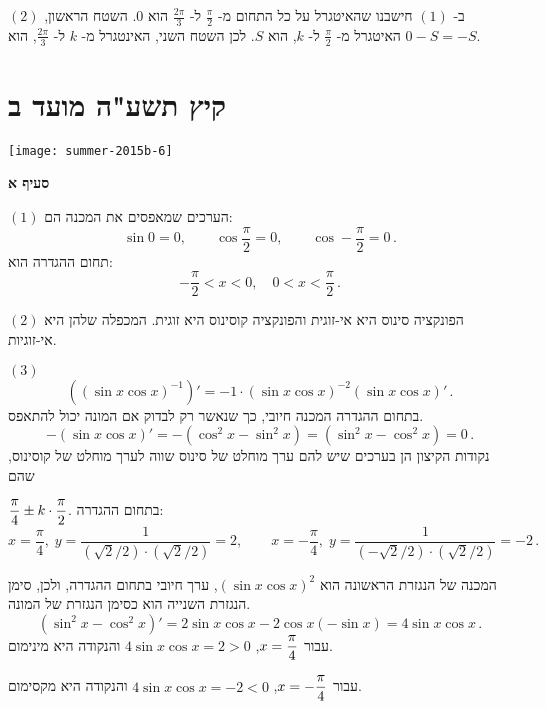 \vspace{-4ex}

$(2)$
ב-%
$(1)$
חישבנו שהאיטגרל על כל התחום מ-%
$\frac{\pi}{2}$
ל-%
$\frac{2\pi}{3}$
הוא 
$0$.
השטח הראשון, האיטגרל מ-%
$\frac{\pi}{2}$
ל-%
$k$,
הוא
$S$.
לכן השטח השני, האינטגרל מ-%
$k$
ל-%
$\frac{2\pi}{3}$,
הוא
$0-S=-S$.

\np


\section{קיץ תשע"ה מועד ב}

\begin{center}
\texttt{[image: summer-2015b-6]}
\end{center}

\textbf{סעיף א}

$(1)$
הערכים שמאפסים את המכנה הם:
\[
\sin 0=0,\quad\quad \cos \frac{\pi}{2}= 0,\quad\quad \cos -\frac{\pi}{2}=0\,.
\]
תחום ההגדרה הוא:
\[
-\frac{\pi}{2} < x < 0,\quad 0 < x < \frac{\pi}{2}\,.
\]

$(2)$
הפונקציה סינוס היא אי-זוגית והפונקציה קוסינוס היא זוגית. המכפלה שלהן היא אי-זוגיות.

$(3)$
\[
((\sin x \cos x)^{-1})'= -1\cdot (\sin x \cos x)^{-2}(\sin x\cos x)'\,.
\]
בתחום ההגדרה המכנה חיובי, כך שנאשר רק לבדוק אם המונה יכול להתאפס.
\[
-(\sin x\cos x)'=-(\cos^2 x-\sin^2 x)=(\sin^2 x-\cos^2 x)=0\,.
\]
נקודות הקיצון הן בערכים שיש להם ערך מוחלט של סינוס שווה לערך מוחלט של קוסינוס, שהם

$\displaystyle\frac{\pi}{4}\pm k\cdot\displaystyle\frac{\pi}{2}$.
בתחום ההגדרה:
\[
x=\frac{\pi}{4},\; y=\frac{1}{(\sqrt{2}/2)\cdot(\sqrt{2}/2)}= 2,\quad\quad x=-\frac{\pi}{4},\; y=\frac{1}{(-\sqrt{2}/2)\cdot(\sqrt{2}/2)}= -2\,.
\]

\np

המכנה של הנגזרת הראשונה הוא 
$(\sin x \cos x)^2$,
ערך חיובי בתחום ההגדרה, ולכן, סימן הנגזרת השנייה הוא כסימן הנגזרת של המונה.
\[
(\sin^2 x-\cos^2 x)'=2\sin x \cos x -2 \cos x (-\sin x)=4\sin x\cos x\,.
\]
עבור
$x=\displaystyle\frac{\pi}{4}$,
$4\sin x\cos x=2>0$
והנקודה היא מינימום.

עבור
$x=-\displaystyle\frac{\pi}{4}$,
$4\sin x\cos x=-2<0$
והנקודה היא מקסימום.

